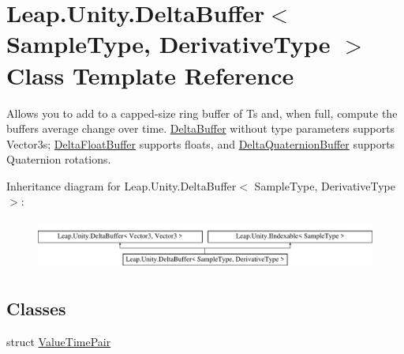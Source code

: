 \hypertarget{class_leap_1_1_unity_1_1_delta_buffer}{}\section{Leap.\+Unity.\+Delta\+Buffer$<$ Sample\+Type, Derivative\+Type $>$ Class Template Reference}
\label{class_leap_1_1_unity_1_1_delta_buffer}


Allows you to add to a capped-\/size ring buffer of Ts and, when full, compute the buffer\textquotesingle{}s average change over time. \mbox{\hyperlink{class_leap_1_1_unity_1_1_delta_buffer}{Delta\+Buffer}} without type parameters supports Vector3s; \mbox{\hyperlink{class_leap_1_1_unity_1_1_delta_float_buffer}{Delta\+Float\+Buffer}} supports floats, and \mbox{\hyperlink{class_leap_1_1_unity_1_1_delta_quaternion_buffer}{Delta\+Quaternion\+Buffer}} supports Quaternion rotations.  


Inheritance diagram for Leap.\+Unity.\+Delta\+Buffer$<$ Sample\+Type, Derivative\+Type $>$\+:\begin{figure}[H]
\begin{center}
\leavevmode
\includegraphics[height=1.666667cm]{class_leap_1_1_unity_1_1_delta_buffer}
\end{center}
\end{figure}
\subsection*{Classes}
\begin{DoxyCompactItemize}
\item 
struct \mbox{\hyperlink{struct_leap_1_1_unity_1_1_delta_buffer_1_1_value_time_pair}{Value\+Time\+Pair}}
\end{DoxyCompactItemize}
